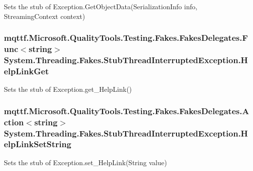 Sets the stub of Exception.\-Get\-Object\-Data(\-Serialization\-Info info, Streaming\-Context context)

\hypertarget{class_system_1_1_threading_1_1_fakes_1_1_stub_thread_interrupted_exception_a66beebf2cb28549a8bd1bdd752aed3bf}{
\subsubsection[{Help\-Link\-Get}]{\setlength{\rightskip}{0pt plus 5cm}mqttf.\-Microsoft.\-Quality\-Tools.\-Testing.\-Fakes.\-Fakes\-Delegates.\-Func$<$string$>$ System.\-Threading.\-Fakes.\-Stub\-Thread\-Interrupted\-Exception.\-Help\-Link\-Get}}\label{class_system_1_1_threading_1_1_fakes_1_1_stub_thread_interrupted_exception_a66beebf2cb28549a8bd1bdd752aed3bf}


Sets the stub of Exception.\-get\-\_\-\-Help\-Link()

\hypertarget{class_system_1_1_threading_1_1_fakes_1_1_stub_thread_interrupted_exception_a187f22e173a6e888d91f09c8bcd915c1}{
\subsubsection[{Help\-Link\-Set\-String}]{\setlength{\rightskip}{0pt plus 5cm}mqttf.\-Microsoft.\-Quality\-Tools.\-Testing.\-Fakes.\-Fakes\-Delegates.\-Action$<$string$>$ System.\-Threading.\-Fakes.\-Stub\-Thread\-Interrupted\-Exception.\-Help\-Link\-Set\-String}}\label{class_system_1_1_threading_1_1_fakes_1_1_stub_thread_interrupted_exception_a187f22e173a6e888d91f09c8bcd915c1}


Sets the stub of Exception.\-set\-\_\-\-Help\-Link(\-String value)

